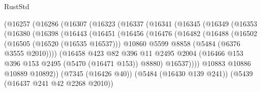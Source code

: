 \begin{lexlean}{RustStd}
\begin{coremodule}
                      (@16257
                        (@16286
                          (@16307
                            (@16323
                              (@16337
                                (@16341
                                  (@16345
                                    (@16349
                                      (@16353
                                        (@16380
                                          (@16398
                                            (@16443
                                              (@16451
                                                (@16456
                                                  (@16476
                                                    (@16482
                                                      (@16488
                                                        (@16502
                                                          (@16505 (@16520 (@16535 @16537)))
                                                          @10860
                                                          @5599
                                                          @8858
                                                          (@5484 (@6376 @3555 @2010))))
                                                      (@16458
                                                        @423
                                                        @82
                                                        @396
                                                        @11
                                                        @2495
                                                        @2004
                                                        (@16466
                                                          @153
                                                          @396
                                                          @153
                                                          @2495
                                                          (@5470 (@16471 @153))
                                                          @8880)
                                                        @16537))))
                                                @10883
                                                @10886
                                                @10889
                                                @10892))
                                            (@7345 (@16426 @40))
                                            (@5484 (@16430 @139 @241))
                                            (@5439 (@16437 @241 @42 @2268 @2010))

\end{coremodule}
\end{lexlean}
